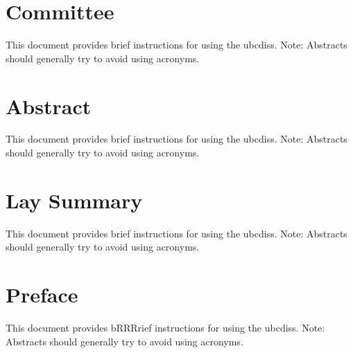 
\let\tempholder\addcontentsline
\let\addcontentsline\relax
\chapter*{Committee}
\let\addcontentsline\tempholder

This document provides brief instructions for using the ubcdiss.
Note: Abstracts should generally try to avoid using acronyms.

\chapter*{Abstract}

This document provides brief instructions for using the ubcdiss.
Note: Abstracts should generally try to avoid using acronyms.

\chapter*{Lay Summary}

This document provides brief instructions for using the ubcdiss.
Note: Abstracts should generally try to avoid using acronyms.

\chapter*{Preface}

This document provides bRRRrief instructions for using the ubcdiss.
Note: Abstracts should generally try to avoid using acronyms.

